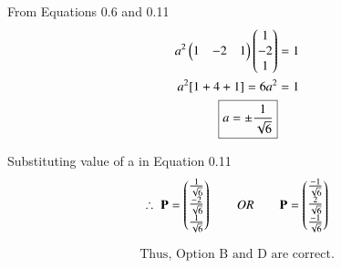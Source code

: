 \documentclass[journal]{IEEEtran}
\begin{document}
From Equations 0.6 and 0.11
\begin{align}
   a^2 \begin{pmatrix}1 & -2 & 1\end{pmatrix} \begin{pmatrix}1 \\ -2 \\ 1\end{pmatrix} &= 1 \\ 
   a^2[1 + 4 + 1] = 6a^2 &= 1\\
   \boxed{a = \pm \dfrac{1}{\sqrt{6}}}
\end{align}

\newpage
Substituting value of a in Equation 0.11
\begin{align}
    \therefore \; \mathbf{P} = \begin{pmatrix}\frac{1}{\sqrt{6}} \\ \frac{-2}{\sqrt{6}} \\ \frac{1}{\sqrt{6}}\end{pmatrix} 
     \qquad OR \qquad
    \mathbf{P} = \begin{pmatrix}\frac{-1}{\sqrt{6}} \\ \frac{2}{\sqrt{6}} \\ \frac{-1}{\sqrt{6}}\end{pmatrix}
    \end{align}

\begin{align*}
    \boxed{\text{Thus, Option B and D are correct.}}
\end{align*}
\end{document}
